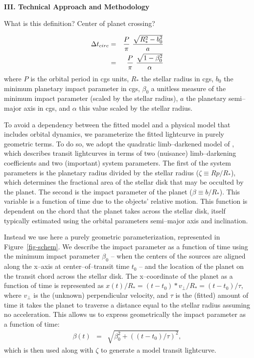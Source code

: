 \bigskip
\centerline{\bf III. Technical Approach and Methodology}
\smallskip

\medskip
{\centerline{}}
\smallskip

What is this definition?  Center of planet crossing?

\begin{eqnarray}
\Delta t_{circ} & = & {{P}\over{\pi}}~{{\sqrt{R_*^2 - b_0^2}}\over{a}} \nonumber \\
                & = & {{P}\over{\pi}}~{{\sqrt{1 - \beta_0^2}}\over{\alpha}}
\label{eq-tcirc}
\end{eqnarray}
where $P$ is the orbital period in cgs units, $R_*$ the stellar radius
in cgs, $b_0$ the minimum planetary impact parameter in cgs, $\beta_0$
a unitless measure of the minimum impact parameter (scaled by the
stellar radius), $a$ the planetary semi--major axis in cgs, and
$\alpha$ this value scaled by the stellar radius.


\medskip
{\centerline{}}
\smallskip

To avoid a dependency between the fitted model and a physical model
that includes orbital dynamics, we parameterize the fitted lightcurve
in purely geometric terms.  To do so, we adopt the quadratic
limb--darkened model of \cite{2002ApJ...580L.171M}, which describes
transit lightcurves in terms of two (nuisance) limb--darkening
coefficients and two (important) system parameters.  The first of the
system parameters is the planetary radius divided by the stellar
radius ($\zeta \equiv Rp/R_*$), which determines the fractional area
of the stellar disk that may be occulted by the planet.  The second is
the impact parameter of the planet ($\beta \equiv b/R_*$).  This
variable is a function of time due to the objects' relative motion.
This function is dependent on the chord that the planet takes across
the stellar disk, itself typically estimated using the orbital
parameters semi--major axis and inclination.

Instead we use here a purely geometric parameterization, represented
in Figure~\ref{fig-schem}.  We describe the impact parameter as a
function of time using the minimum impact parameter $\beta_0$ -- when
the centers of the sources are aligned along the x--axis at
center--of--transit time $t_0$ -- and the location of the planet on
the transit chord across the stellar disk.  The x--coordinate of the
planet as a function of time is represented as $x(t) / R_* = (t - t_0)
* v_\perp / R_* = (t - t_0) / \tau$, where $v_\perp$ is the (unknown)
perpendicular velocity, and $\tau$ is the (fitted) amount of time it
takes the planet to traverse a distance equal to the stellar radius
assuming no acceleration.  This allows us to express geometrically the
impact parameter as a function of time:
\begin{eqnarray}
\beta(t) & = & \sqrt{\beta_0^2 + \left((t - t_0) / \tau\right)^2},
\end{eqnarray}
which is then used along with $\zeta$ to generate a model transit
lightcurve.

